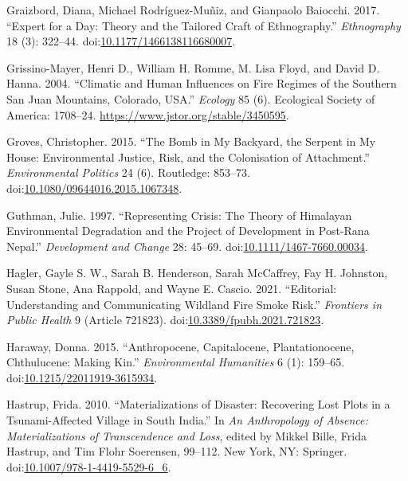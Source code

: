 \documentclass[
]{article}
\newlength{\cslhangindent}
\newenvironment{CSLReferences}[2] %
 {\begin{list}{}{%
  \setlength{\itemindent}{0pt}
  \setlength{\leftmargin}{0pt}
  \setlength{\parsep}{0pt}
  \ifodd #1
   \setlength{\leftmargin}{\cslhangindent}
   \setlength{\itemindent}{-1\cslhangindent}
  \fi
  \setlength{\itemsep}{#2\baselineskip}}}
 {\end{list}}
\begin{document}
\begin{CSLReferences}{1}{0}
Graizbord, Diana, Michael Rodríguez-Muñiz, and Gianpaolo Baiocchi. 2017. {``Expert for a Day: {Theory} and the Tailored Craft of Ethnography.''} \emph{Ethnography} 18 (3): 322--44. doi:\href{https://doi.org/10.1177/1466138116680007}{10.1177/1466138116680007}.

Grissino-Mayer, Henri D., William H. Romme, M. Lisa Floyd, and David D. Hanna. 2004. {``Climatic and {Human Influences} on {Fire Regimes} of the {Southern San Juan Mountains}, {Colorado}, {USA}.''} \emph{Ecology} 85 (6). Ecological Society of America: 1708--24. \url{https://www.jstor.org/stable/3450595}.

Groves, Christopher. 2015. {``The Bomb in My Backyard, the Serpent in My House: Environmental Justice, Risk, and the Colonisation of Attachment.''} \emph{Environmental Politics} 24 (6). Routledge: 853--73. doi:\href{https://doi.org/10.1080/09644016.2015.1067348}{10.1080/09644016.2015.1067348}.

Guthman, Julie. 1997. {``Representing {Crisis}: {The Theory} of {Himalayan Environmental Degradation} and the {Project} of {Development} in {Post-Rana Nepal}.''} \emph{Development and Change} 28: 45--69. doi:\href{https://doi.org/10.1111/1467-7660.00034}{10.1111/1467-7660.00034}.

Hagler, Gayle S. W., Sarah B. Henderson, Sarah McCaffrey, Fay H. Johnston, Susan Stone, Ana Rappold, and Wayne E. Cascio. 2021. {``Editorial: {Understanding} and Communicating Wildland Fire Smoke Risk.''} \emph{Frontiers in Public Health} 9 (Article 721823). doi:\href{https://doi.org/10.3389/fpubh.2021.721823}{10.3389/fpubh.2021.721823}.

Haraway, Donna. 2015. {``Anthropocene, {Capitalocene}, {Plantationocene}, {Chthulucene}: {Making Kin}.''} \emph{Environmental Humanities} 6 (1): 159--65. doi:\href{https://doi.org/10.1215/22011919-3615934}{10.1215/22011919-3615934}.

Hastrup, Frida. 2010. {``Materializations of {Disaster}: {Recovering Lost Plots} in a {Tsunami-Affected Village} in {South India}.''} In \emph{An {Anthropology} of {Absence}: {Materializations} of {Transcendence} and {Loss}}, edited by Mikkel Bille, Frida Hastrup, and Tim Flohr Soerensen, 99--112. New York, NY: Springer. doi:\href{https://doi.org/10.1007/978-1-4419-5529-6_6}{10.1007/978-1-4419-5529-6\_6}.


\end{CSLReferences}
\end{document}
